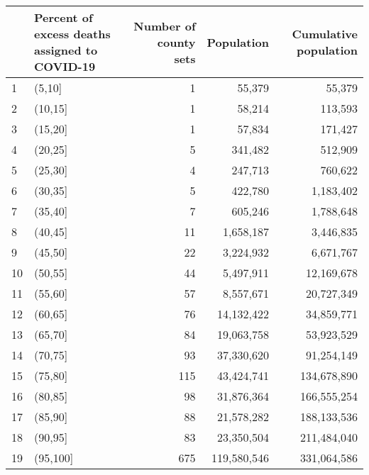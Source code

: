 
\begin{tabular}[t]{llrrr}
\toprule
  & Percent of excess deaths 
 assigned to COVID-19 & Number of county sets & Population & Cumulative population\\
\midrule
1 & (5,10] & 1 & 55,379 & 55,379\\
2 & (10,15] & 1 & 58,214 & 113,593\\
3 & (15,20] & 1 & 57,834 & 171,427\\
4 & (20,25] & 5 & 341,482 & 512,909\\
5 & (25,30] & 4 & 247,713 & 760,622\\
6 & (30,35] & 5 & 422,780 & 1,183,402\\
7 & (35,40] & 7 & 605,246 & 1,788,648\\
8 & (40,45] & 11 & 1,658,187 & 3,446,835\\
9 & (45,50] & 22 & 3,224,932 & 6,671,767\\
10 & (50,55] & 44 & 5,497,911 & 12,169,678\\
11 & (55,60] & 57 & 8,557,671 & 20,727,349\\
12 & (60,65] & 76 & 14,132,422 & 34,859,771\\
13 & (65,70] & 84 & 19,063,758 & 53,923,529\\
14 & (70,75] & 93 & 37,330,620 & 91,254,149\\
15 & (75,80] & 115 & 43,424,741 & 134,678,890\\
16 & (80,85] & 98 & 31,876,364 & 166,555,254\\
17 & (85,90] & 88 & 21,578,282 & 188,133,536\\
18 & (90,95] & 83 & 23,350,504 & 211,484,040\\
19 & (95,100] & 675 & 119,580,546 & 331,064,586\\
\bottomrule
\end{tabular}
